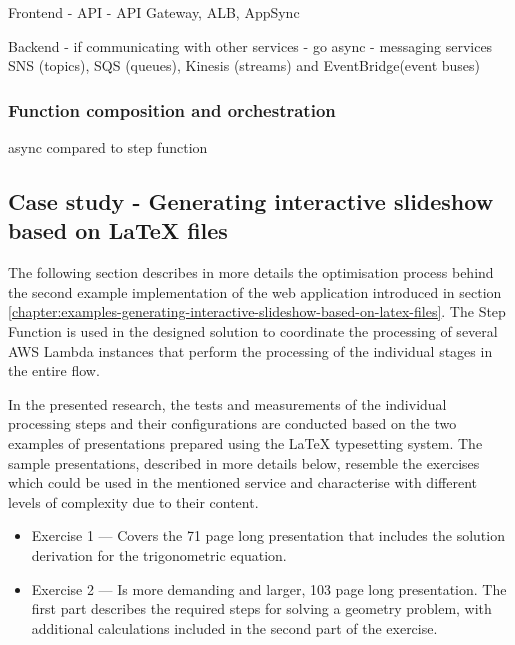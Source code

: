 Frontend - API - API Gateway, ALB, AppSync

Backend - if communicating with other services - go async - messaging services SNS (topics), SQS (queues), Kinesis (streams) and EventBridge(event buses)


\subsubsection{Function composition and orchestration} \label{chapter:serverless-processing-function-composition-and-orchestration}

async compared to step function


\subsection{Case study - Generating interactive slideshow based on LaTeX files} \label{chapter:latex-processing-optimisation}

The following section describes in more details the optimisation process behind the second example implementation of the web application introduced in section \ref{chapter:examples-generating-interactive-slideshow-based-on-latex-files}.
The Step Function is used in the designed solution to coordinate the processing of several AWS Lambda instances that perform the processing of the individual stages in the entire flow.

In the presented research, the tests and measurements of the individual processing steps and their configurations are conducted based on the two examples of presentations prepared using the LaTeX typesetting system.
The sample presentations, described in more details below,  resemble the exercises which could be used in the mentioned service and characterise with different levels of complexity due to their content.

\begin{itemize}
   \item Exercise 1 --- Covers the 71 page long presentation that includes the solution derivation for the trigonometric equation.
   \item Exercise 2 --- Is more demanding and larger, 103 page long presentation. The first part describes the required steps for solving a geometry problem, with additional calculations included in the second part of the exercise.
\end{itemize}

